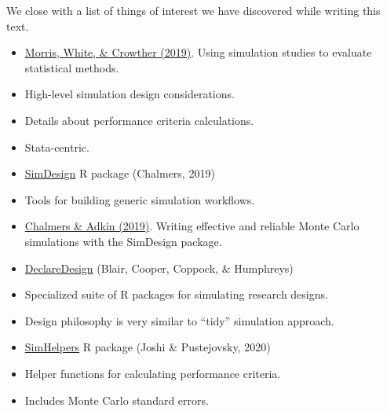 \documentclass[
]{book}
\begin{document}
We close with a list of things of interest we have discovered while writing this text.

\begin{itemize}
\item
  \href{https://doi.org/10.1002/sim.8086}{Morris, White, \& Crowther (2019)}. Using simulation studies to evaluate statistical methods.
\item
  High-level simulation design considerations.
\item
  Details about performance criteria calculations.
\item
  Stata-centric.
\item
  \href{https://github.com/philchalmers/SimDesign/wiki}{SimDesign} R package (Chalmers, 2019)
\item
  Tools for building generic simulation workflows.
\item
  \href{http://www.tqmp.org/RegularArticles/vol16-4/p248/}{Chalmers \& Adkin (2019)}. Writing effective and reliable Monte Carlo simulations with the SimDesign package.
\item
  \href{https://declaredesign.org/}{DeclareDesign} (Blair, Cooper, Coppock, \& Humphreys)
\item
  Specialized suite of R packages for simulating research designs.
\item
  Design philosophy is very similar to ``tidy'' simulation approach.
\item
  \href{https://meghapsimatrix.github.io/simhelpers/index.html}{SimHelpers} R package (Joshi \& Pustejovsky, 2020)
\item
  Helper functions for calculating performance criteria.
\item
  Includes Monte Carlo standard errors.
\end{itemize}

  
\end{document}
